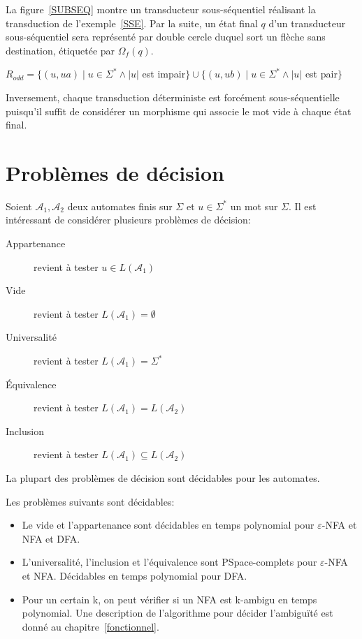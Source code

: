 	La figure~\ref{SUBSEQ} montre un transducteur sous-séquentiel réalisant la transduction de l'exemple~\ref{SSE}. Par la suite, un état final $q$ d'un transducteur sous-séquentiel sera représenté par double cercle duquel sort un flèche sans destination, étiquetée par $\Omega_f(q)$. \\

	

	\begin{example}
		$R_{odd} = \{(u,ua) \mid u \in \Sigma^* \wedge |u|$ est impair$\} \cup \{(u,ub) \mid u \in \Sigma^* \wedge |u|$ est pair$\}$
		\label{SSE}
	\end{example}

	Inversement, chaque transduction déterministe est forcément sous-séquentielle puisqu'il suffit de considérer un morphisme qui associe le mot vide à chaque état final.

\section{Problèmes de décision}
\label{prob}

	Soient $\mathscr{A}_1, \mathscr{A}_2$ deux automates finis sur $\Sigma$ et $u \in \Sigma^*$ un mot sur $\Sigma$. Il est intéressant de considérer plusieurs problèmes de décision:
	
	\begin{description}
	  	\item[Appartenance] revient à tester $u \in L(\mathscr{A}_1)$
	   	\item[Vide] revient à tester $L(\mathscr{A}_1) = \emptyset$
	   	\item[Universalité] revient à tester $L(\mathscr{A}_1) = \Sigma^*$
	   	\item[\'{E}quivalence] revient à tester $L(\mathscr{A}_1) = L(\mathscr{A}_2)$
	   	\item[Inclusion] revient à tester $L(\mathscr{A}_1) \subseteq L(\mathscr{A}_2)$
	    \end{description}
	
	La plupart des problèmes de décision sont décidables pour les automates. \\

    \begin{proposition}
    	Les problèmes suivants sont décidables:
    	
    	\begin{itemize}
    		\item Le vide et l'appartenance sont décidables en temps polynomial pour $\varepsilon$-NFA et NFA et DFA.
    		\item L'universalité, l'inclusion et l'équivalence sont PSpace-complets pour $\varepsilon$-NFA et NFA. Décidables en temps polynomial pour DFA.
    		\item Pour un certain k, on peut vérifier si un NFA est k-ambigu en temps polynomial. Une description de l'algorithme pour décider l'ambiguïté est donné au chapitre~\ref{fonctionnel}.
    	\end{itemize}
    \end{proposition}
    
